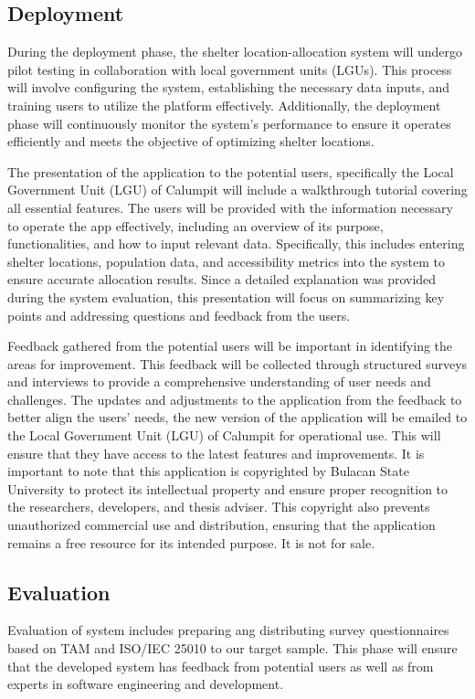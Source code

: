 \subsection{Deployment}
	During the deployment phase, the shelter location-allocation system will undergo pilot testing in collaboration with local government units (LGUs). This process will involve configuring the system, establishing the necessary data inputs, and training users to utilize the platform effectively. Additionally, the deployment phase will continuously monitor the system's performance to ensure it operates efficiently and meets the objective of optimizing shelter locations. 

	The presentation of the application to the potential users, specifically the Local Government Unit (LGU) of Calumpit will include a walkthrough tutorial covering all essential features. The users will be provided with the information necessary to operate the app effectively, including an overview of its purpose, functionalities, and how to input relevant data. Specifically, this includes entering shelter locations, population data, and accessibility metrics into the system to ensure accurate allocation results. Since a detailed explanation was provided during the system evaluation, this presentation will focus on summarizing key points and addressing questions and feedback from the users.

	Feedback gathered from the potential users will be important in identifying the areas for improvement. This feedback will be collected through structured surveys and interviews to provide a comprehensive understanding of user needs and challenges. The updates and adjustments to the application from the feedback to better align the users’ needs, the new version of the application will be emailed to the Local Government Unit (LGU) of Calumpit for operational use. This will ensure that they have access to the latest features and improvements. It is important to note that this application is copyrighted by Bulacan State University to protect its intellectual property and ensure proper recognition to the researchers, developers, and thesis adviser. This copyright also prevents unauthorized commercial use and distribution, ensuring that the application remains a free resource for its intended purpose. It is not for sale.
	
\subsection{Evaluation}
	Evaluation of system includes preparing ang distributing survey questionnaires based on TAM and ISO/IEC 25010 to our target sample. This phase will ensure that the developed system has feedback from potential users as well as from experts in software engineering and development.

